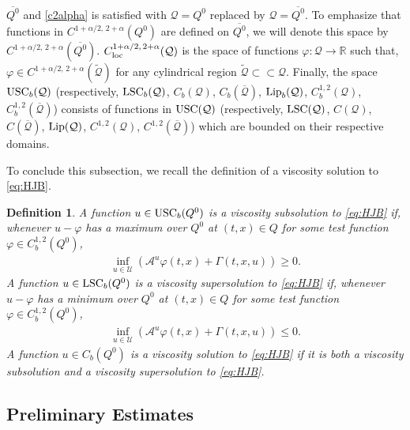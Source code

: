 \documentclass[amscd,amssymb,11pt]{article}
\newtheorem{definition}[theorem]{Definition}
\numberwithin{theorem}{section}
\numberwithin{equation}{section}
\begin{document}
$\overline{Q^0}$ and \eqref{c2alpha} is satisfied with $\mathcal{Q}=Q^0$ replaced by $\mathcal{Q}=\overline{Q^0}$. To emphasize that functions in $C^{1+\alpha/2,\,2+\alpha}(Q^0)$ are defined on $\overline{Q^0}$, we will denote this space by 
$C^{1+\alpha/2,\,2+\alpha}(\overline{Q^0})$.
$C^{1+\alpha/2,\,2+\alpha}_{\rm loc}(\mathcal{Q})$ is the space of functions $\varphi:\mathcal{Q}\rightarrow\mathbb{R}$ such that, $\varphi\in
C^{1+\alpha/2,\,2+\alpha}(\widetilde{\mathcal{Q}})$ for any cylindrical region $\widetilde{\mathcal{Q}}\subset\subset\mathcal{Q}$. Finally, the space ${\rm USC}_{b}(\mathcal{Q})$ (respectively, ${\rm LSC}_{b}(\mathcal{Q})$, $C_{b}(\mathcal{Q})$, $C_{b}(\overline{\mathcal{Q}})$,
${\rm Lip}_{b}(\mathcal{Q})$, $C_{b}^{1,2}(\mathcal{Q})$, $C_{b}^{1,2}(\overline{\mathcal{Q}})$) consists of functions in ${\rm USC}(\mathcal{Q})$ (respectively, ${\rm LSC}(\mathcal{Q})$, $C(\mathcal{Q})$, $C(\overline{\mathcal{Q}})$, ${\rm Lip}(\mathcal{Q})$, $C^{1,2}(\mathcal{Q})$, $C^{1,2}(\overline{\mathcal{Q}})$) which are bounded on their respective domains.

To conclude this subsection, we recall the definition of a viscosity solution to \eqref{eq:HJB}.
\begin{definition}\label{def:VisSol}
A function $u\in {\rm USC}_{b}(Q^{0})$ is a viscosity subsolution to \eqref{eq:HJB} if, whenever $u-\varphi$ has a maximum over $Q^{0}$ at $(t,x)\in Q$ for some test function $\varphi\in C_{b}^{1,2}(Q^{0})$,
\begin{align*}
\inf_{u\in\mathcal{U}}\left(\mathscr{A}^{u}\varphi(t,x)+\Gamma(t,x,u)\right)\geq 0.
\end{align*}
A function $u\in {\rm LSC}_b(Q^{0})$ is a viscosity supersolution to \eqref{eq:HJB} if, whenever $u-\varphi$ has a minimum over $Q^{0}$ at $(t,x)\in Q$ for some test function $\varphi\in C_{b}^{1,2}(Q^{0})$,
\begin{align*}
\inf_{u\in\mathcal{U}}\left(\mathscr{A}^{u}\varphi(t,x)+\Gamma(t,x,u)\right)\leq0.
\end{align*}
A function $u\in C_{b}(Q^{0})$ is a viscosity solution to \eqref{eq:HJB} if it is both a viscosity subsolution and a viscosity supersolution to \eqref{eq:HJB}.
\end{definition}


\subsection{Preliminary Estimates}\label{subsec:PreEst}
\end{document}
